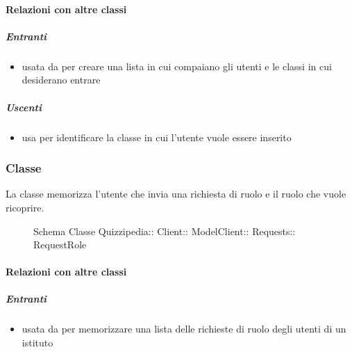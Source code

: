 \paragraph{Relazioni con altre classi}
\subparagraph{Entranti}
\begin{itemize}
\item usata da  per creare una lista in cui compaiano gli utenti e le classi in cui desiderano entrare
\end{itemize}
\subparagraph{Uscenti}
\begin{itemize}
\item usa  per identificare la classe
in cui l'utente vuole essere inserito
\end{itemize}
\subsubsection{Classe }
La classe memorizza l'utente che invia una richiesta di ruolo e il ruolo che vuole ricoprire.
\begin{figure}[H]
\centering
\noindent{}
\caption[Schema Classe RequestRole]{Schema Classe Quizzipedia:: Client:: ModelClient:: Requests:: RequestRole}
\end{figure}
\paragraph{Relazioni con altre classi}
\subparagraph{Entranti}
\begin{itemize}
\item usata da  per memorizzare una lista delle richieste di ruolo degli utenti di un istituto
\end{itemize}
